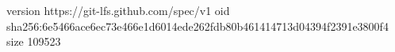 version https://git-lfs.github.com/spec/v1
oid sha256:6e5466ace6ec73e466e1d6014ede262fdb80b461414713d04394f2391e3800f4
size 109523
